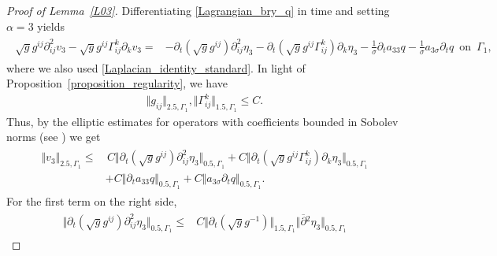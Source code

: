 \documentclass[10pt,reqno]{amsart}
\theoremstyle{plain}
\theoremstyle{definition}
\numberwithin{equation}{section}
\newcommand{\al}{\alpha}
\newcommand{\Ga}{\Gamma}
\newcommand{\si}{\sigma}
\newcommand{\norm}[1]{\Vert#1\Vert}
\begin{document}
{\begin{proof}[Proof of Lemma~\ref{L03}]
Differentiating \eqref{Lagrangian_bry_q} in time  and setting $\al=3$ yields
\begin{align}
\begin{split}
\sqrt{g} g^{ij} \partial^2_{ij} v_3 - \sqrt{g} g^{ij} \Ga_{ij}^k \partial_k v_3 
= & - \partial_t(\sqrt{g} g^{ij} ) \partial^2_{ij} \eta_3 - \partial_t( \sqrt{g} g^{ij} \Ga_{ij}^k ) \partial_k \eta_3 
- \frac{1}{\si} \partial_t a_{3 3} q - \frac{1}{\si} a_{3 \si} \partial_t q \, \text{ on } \, \Ga_1
 ,
\end{split}
\nonumber
\end{align}
where we also used
\eqref{Laplacian_identity_standard}.
In light of Proposition~\ref{proposition_regularity}, we have
\begin{gather}
\norm{ g_{ij} }_{2.5,\Ga_1},
\norm{ \Ga_{ij}^k }_{1.5,\Ga_1}
\leq C.
\end{gather}
Thus, by the elliptic estimates for operators with coefficients bounded in Sobolev norms (see \cite{CoutandShkollerFreeBoundary,EbenfeldEllipticRegularity})
we get
\begin{align}
\begin{split}
\norm{ v_3 }_{2.5,\Ga_1} \leq 
&
\, C
\norm{ \partial_t(\sqrt{g} g^{ij} ) \partial^2_{ij} \eta_3 }_{0.5,\Ga_1}
+ C \norm{ \partial_t( \sqrt{g} g^{ij} \Ga_{ij}^k ) \partial_k \eta_3 }_{0.5,\Ga_1}
\\
&
+C\norm{\partial_t a_{3 3} q}_{0.5,\Ga_1}
+C\norm{ a_{3 \si} \partial_t q }_{0.5,\Ga_1}
   .
\end{split}
\nonumber
\end{align}
For the first term on the right side,
\begin{align}
\begin{split}
\norm{ \partial_t(\sqrt{g} g^{ij} ) \partial^2_{ij} \eta_3 }_{0.5,\Ga_1} \leq &
C \norm{ \partial_t (\sqrt{g} g^{-1} )}_{1.5,\Ga_1} \norm{\overline{\partial}{}^2 \eta_3}_{0.5,\Ga_1} 

\end{split}
\end{align}
\end{proof}}
\end{document}
